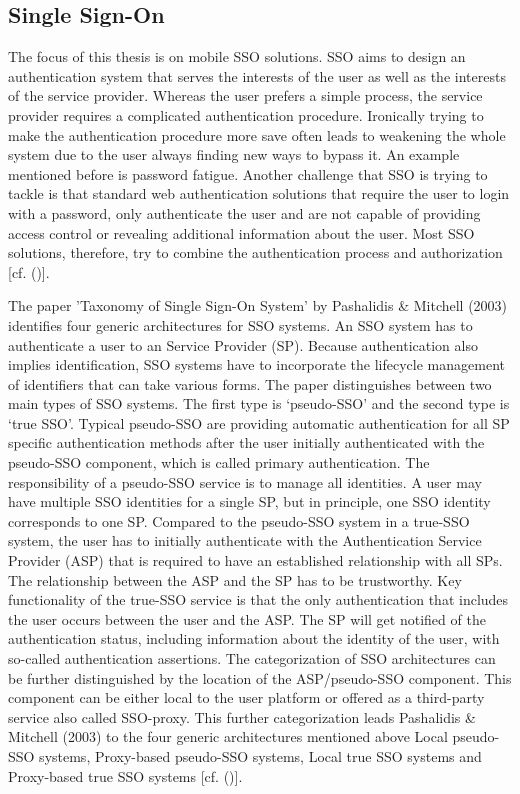 {{		\subsection{Single Sign-On}
		\label{singlesignon}	The focus of this thesis is on mobile SSO solutions. SSO aims to design an authentication system that serves the interests of the user as well as the interests of the service provider. Whereas the user prefers a simple process, the service provider requires a complicated authentication procedure. Ironically trying to make the authentication procedure more save often leads to weakening the whole system due to the user always finding new ways to bypass it. An example mentioned before is password fatigue. Another challenge that SSO is trying to tackle is that standard web authentication solutions that require the user to login with a password, only authenticate the user and are not capable of providing access control or revealing additional information about the user. Most SSO solutions, therefore, try to combine the authentication process and authorization [cf. (\cite{Prochazka:2010:UCA})].
		
		The paper 'Taxonomy of Single Sign-On System' by Pashalidis \& Mitchell (2003) identifies four generic architectures for SSO systems. An SSO system has to authenticate a user to an Service Provider (SP). Because authentication also implies identification, SSO systems have to incorporate the lifecycle management of identifiers that can take various forms. The paper distinguishes between two main types of SSO systems. The first type is ‘pseudo-SSO’ and the second type is ‘true SSO’. Typical pseudo-SSO are providing automatic authentication for all SP specific authentication methods after the user initially authenticated with the pseudo-SSO component, which is called primary authentication. The responsibility of a pseudo-SSO service is to manage all identities. A user may have multiple SSO identities for a single SP, but in principle, one SSO identity corresponds to one SP. Compared to the pseudo-SSO system in a true-SSO system, the user has to initially authenticate with the Authentication Service Provider (ASP) that is required to have an established relationship with all SPs. The relationship between the ASP and the SP has to be trustworthy. Key functionality of the true-SSO service is that the only authentication that includes the user occurs between the user and the ASP. The SP will get notified of the authentication status, including information about the identity of the user, with so-called authentication assertions. The categorization of SSO architectures can be further distinguished by the location of the ASP/pseudo-SSO component. This component can be either local to the user platform or offered as a third-party service also called SSO-proxy. This further categorization leads Pashalidis \& Mitchell (2003) to the four generic architectures mentioned above Local pseudo-SSO systems, Proxy-based pseudo-SSO systems, Local true SSO systems and Proxy-based true SSO systems  [cf. (\cite{Pashalidis:2003:10.1007/3-540-45067-X_22})].
		
}}
